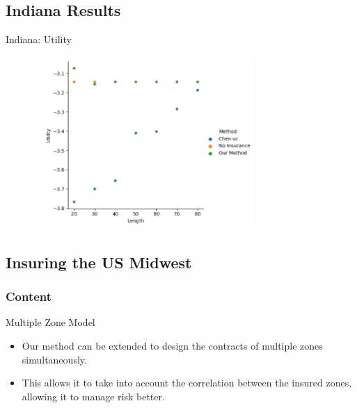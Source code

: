 \documentclass{beamer}
\begin{document}

\subsection*{Indiana Results}
\begin{frame}{Indiana: Utility}
    \begin{figure}
        \includegraphics[width=0.75\textwidth]{../../../output/figures/Evaluation 2/Indiana_Utility_Length_ml1.png}
    \end{figure}
\end{frame}



\subsection{Insuring the US Midwest}
\begin{frame}
    \frametitle{Content}
    \tableofcontents[currentsubsection]
  \end{frame}

\begin{frame}{Multiple Zone Model}
\begin{itemize}
    \setlength\itemsep{2em}
    \item Our method can be extended to design the contracts of multiple zones simultaneously. 
    \item This allows it to take into account the correlation between the insured zones, allowing it to manage risk better. 
\end{itemize}
\end{frame}
\end{document}
